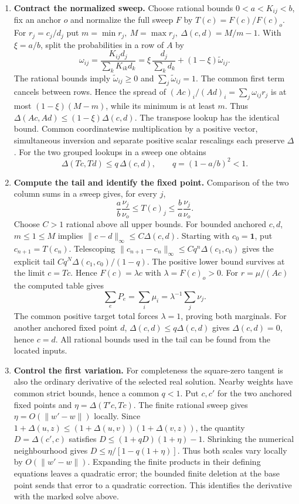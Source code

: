 \documentclass[11pt,a4paper]{article}
\theoremstyle{definition}
\theoremstyle{remark}\newaliascnt{remark}{theorem}
\numberwithin{equation}{section}
\begin{document}
\begin{enumerate}[titledsteps]
    \item \textbf{Contract the normalized sweep.} Choose rational bounds \(0<a<K_{ij}<b\), fix an anchor \(o\) and normalize the full sweep \(F\) by \(T(c)=F(c)/F(c)_o\). For \(r_j=c_j/d_j\) put \(m=\min r_j,\ M=\max r_j,\ \Delta(c,d)=M/m-1\). With \(\xi=a/b\), split the probabilities in a row of \(A\) by
\[
 \omega_{ij}=\frac{K_{ij}d_j}{\sum_kK_{ik}d_k}
           =\xi\,\frac{d_j}{\sum_k d_k}+(1-\xi)\widetilde\omega_{ij}.
\]
The rational bounds imply \(\widetilde\omega_{ij}\ge0\) and \(\sum_j\widetilde\omega_{ij}=1\). The common first term cancels between rows. Hence the spread of \((Ac)_i/(Ad)_i=\sum_j\omega_{ij}r_j\) is at most \((1-\xi)(M-m)\), while its minimum is at least \(m\). Thus \(\Delta(Ac,Ad)\le(1-\xi)\Delta(c,d)\). The transpose lookup has the identical bound. Common coordinatewise multiplication by a positive vector, simultaneous inversion and separate positive scalar rescalings each preserve \(\Delta\). For the two grouped lookups in a sweep one obtains
\[
 \Delta(Tc,Td)\le q\,\Delta(c,d),\qquad q=(1-a/b)^2<1 .
\]

    \item \textbf{Compute the tail and identify the fixed point.} Comparison of the two column sums in a sweep gives, for every \(j\),
\[
 \frac ab\frac{\nu_j}{\nu_o}\le T(c)_j\le\frac ba\frac{\nu_j}{\nu_o}.
\]
Choose \(C>1\) rational above all upper bounds. For bounded anchored \(c,d\), \(m\le1\le M\) implies \(\|c-d\|_\infty\le C\Delta(c,d)\). Starting with \(c_0=\mathbf1\), put \(c_{n+1}=T(c_n)\). Telescoping \(\|c_{n+1}-c_n\|_\infty\le Cq^n\Delta(c_1,c_0)\) gives the explicit tail \(Cq^N\Delta(c_1,c_0)/(1-q)\). The positive lower bound survives at the limit \(c=Tc\). Hence \(F(c)=\lambda c\) with \(\lambda=F(c)_o>0\). For \(r=\mu/(Ac)\) the computed table gives
\[
 \sum_e P_e=\sum_i\mu_i=\lambda^{-1}\sum_j\nu_j .
\]
The common positive target total forces \(\lambda=1\), proving both marginals. For another anchored fixed point \(d\), \(\Delta(c,d)\le q\Delta(c,d)\) gives \(\Delta(c,d)=0\), hence \(c=d\). All rational bounds used in the tail can be found from the located inputs.


    \item \textbf{Control the first variation.} For completeness the square-zero tangent is also the ordinary derivative of the selected real solution. Nearby weights have common strict bounds, hence a common $q<1$. Put $c,c'$ for the two anchored fixed points and $\eta=\Delta(T'c,Tc)$. The finite rational sweep gives $\eta=O(\|w'-w\|)$ locally. Since $1+\Delta(u,z)\le(1+\Delta(u,v))(1+\Delta(v,z))$, the quantity $D=\Delta(c',c)$ satisfies $D\le (1+qD)(1+\eta)-1$. Shrinking the numerical neighbourhood gives $D\le\eta/[1-q(1+\eta)]$. Thus both scales vary locally by $O(\|w'-w\|)$. Expanding the finite products in their defining equations leaves a quadratic error; the bounded finite deletion at the base point sends that error to a quadratic correction. This identifies the derivative with the marked solve above.



\end{enumerate}
\end{document}

